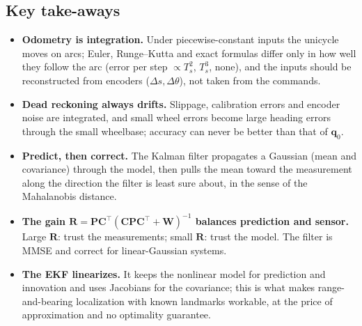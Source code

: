 \documentclass[11pt,a4paper]{article}
\newcommand{\Ts}{T_s}
\newcommand{\bq}{\boldsymbol{q}}
\newcommand{\mC}{\mathbf{C}}
\newcommand{\mP}{\mathbf{P}}
\newcommand{\mR}{\mathbf{R}}
\newcommand{\mW}{\mathbf{W}}
\newcommand{\tp}{^{\top}}
\theoremstyle{plain}
\theoremstyle{definition}
\theoremstyle{remark}
\begin{document}
\subsection{Key take-aways}

\begin{itemize}
\item \textbf{Odometry is integration.} Under piecewise-constant inputs the unicycle moves on arcs; Euler, Runge--Kutta and exact formulas differ only in how well they
follow the arc (error per step $\propto\Ts^2$, $\Ts^3$, none), and the inputs should be reconstructed from encoders ($\Delta s,\Delta\theta$), not taken from the commands.
\item \textbf{Dead reckoning always drifts.} Slippage, calibration errors and encoder noise are integrated, and small wheel errors become large heading errors
through the small wheelbase; accuracy can never be better than that of $\bq_0$.
\item \textbf{Predict, then correct.} The Kalman filter propagates a Gaussian (mean and covariance) through the model, then pulls the mean toward the measurement
along the direction the filter is least sure about, in the sense of the Mahalanobis distance.
\item \textbf{The gain $\mR=\mP\mC\tp(\mC\mP\mC\tp+\mW)^{-1}$ balances prediction and sensor.} Large $\mR$: trust the measurements; small $\mR$: trust the model. The
filter is MMSE and correct for linear-Gaussian systems.
\item \textbf{The EKF linearizes.} It keeps the nonlinear model for prediction and innovation and uses Jacobians for the covariance; this is what makes range-and-bearing
localization with known landmarks workable, at the price of approximation and no optimality guarantee.
\end{itemize}
\end{document}
